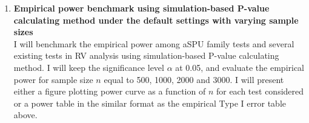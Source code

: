 \documentclass[12pt]{article}
\begin{document}
\begin{enumerate}


\item \textbf{Empirical power benchmark using simulation-based P-value calculating method under the default settings with varying sample sizes}\\
I will benchmark the empirical power among aSPU family tests and several existing tests in RV analysis using simulation-based P-value calculating method. I will keep the significance level $\alpha$ at 0.05, and evaluate the empirical power for sample size $n$ equal to 500, 1000, 2000 and 3000. I will present either a figure plotting power curve as a function of $n$ for each test considered or a power table in the similar format as the empirical Type I error table above.



\end{enumerate}
\end{document}
